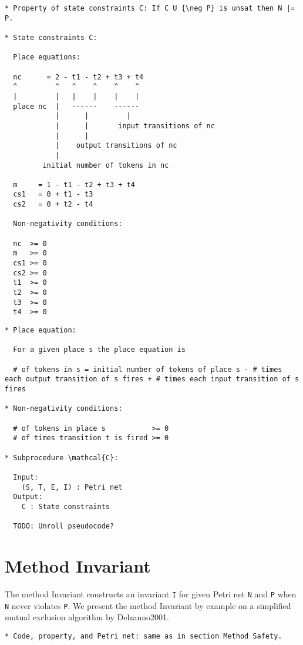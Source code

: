 \documentclass{article}
\begin{document}
\begin{verbatim}
* Property of state constraints C: If C U {\neg P} is unsat then N |= P.

* State constraints C:

  Place equations:

  nc      = 2 - t1 - t2 + t3 + t4
  ^         ^   ^    ^    ^    ^
  |         |   |    |    |    |
  place nc  |   ------    ------
            |      |         |
            |      |       input transitions of nc
            |      |    
            |    output transitions of nc
            |
         initial number of tokens in nc

  m     = 1 - t1 - t2 + t3 + t4
  cs1   = 0 + t1 - t3
  cs2   = 0 + t2 - t4

  Non-negativity conditions:

  nc  >= 0
  m   >= 0
  cs1 >= 0
  cs2 >= 0
  t1  >= 0
  t2  >= 0
  t3  >= 0
  t4  >= 0
\end{verbatim}

\newpage
\begin{verbatim}
* Place equation:
  
  For a given place s the place equation is

  # of tokens in s = initial number of tokens of place s - # times each output transition of s fires + # times each input transition of s fires

* Non-negativity conditions:

  # of tokens in place s           >= 0
  # of times transition t is fired >= 0

* Subprocedure \mathcal{C}:

  Input:
    (S, T, E, I) : Petri net
  Output:
    C : State constraints

  TODO: Unroll pseudocode?
\end{verbatim}

\newpage
\section{Method Invariant}

The method Invariant constructs an invariant \verb=I= for given Petri net \verb=N= and \verb=P= when \verb=N= never violates \verb=P=.
We present the method Invariant by example on a simplified mutual exclusion algorithm by Delzanno2001.

\begin{verbatim}
* Code, property, and Petri net: same as in section Method Safety.
\end{verbatim}
\end{document}
